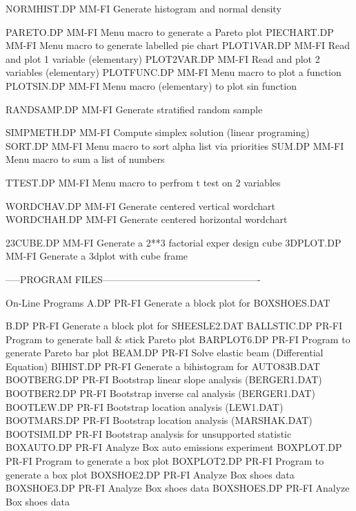 NORMHIST.DP                 MM-FI Generate histogram and normal density

PARETO.DP                   MM-FI Menu macro to generate a Pareto plot
PIECHART.DP                 MM-FI Menu macro to generate labelled pie chart
PLOT1VAR.DP                 MM-FI Read and plot 1 variable (elementary)
PLOT2VAR.DP                 MM-FI Read and plot 2 variables (elementary)
PLOTFUNC.DP                 MM-FI Menu macro to plot a function
PLOTSIN.DP                  MM-FI Menu macro (elementary) to plot sin function

RANDSAMP.DP                 MM-FI Generate stratified random sample

SIMPMETH.DP                 MM-FI Compute simplex solution (linear programing)
SORT.DP                     MM-FI Menu macro to sort alpha list via priorities
SUM.DP                      MM-FI Menu macro to sum a list of numbers

TTEST.DP                    MM-FI Menu macro to perfrom t test on 2 variables

WORDCHAV.DP                 MM-FI Generate centered vertical wordchart
WORDCHAH.DP                 MM-FI Generate centered horizontal wordchart

23CUBE.DP                   MM-FI Generate a 2**3 factorial exper design cube
3DPLOT.DP                   MM-FI Generate a 3dplot with cube frame

-----PROGRAM FILES-------------------------------------------------

On-Line Programs
A.DP                        PR-FI Generate a block plot for BOXSHOES.DAT

B.DP                        PR-FI Generate a block plot for SHEESLE2.DAT
BALLSTIC.DP                 PR-FI Program to generate ball & stick Pareto plot
BARPLOT6.DP                 PR-FI Program to generate Pareto bar plot
BEAM.DP                     PR-FI Solve elastic beam (Differential Equation)
BIHIST.DP                   PR-FI Generate a bihistogram for AUTO83B.DAT
BOOTBERG.DP                 PR-FI Bootstrap linear slope analysis (BERGER1.DAT)
BOOTBER2.DP                 PR-FI Bootstrap inverse cal analysis (BERGER1.DAT)
BOOTLEW.DP                  PR-FI Bootstrap location analysis (LEW1.DAT)
BOOTMARS.DP                 PR-FI Bootstrap location analysis (MARSHAK.DAT)
BOOTSIMI.DP                 PR-FI Bootstrap analysis for unsupported statistic
BOXAUTO.DP                  PR-FI Analyze Box auto emissions experiment
BOXPLOT.DP                  PR-FI Program to generate a box plot
BOXPLOT2.DP                 PR-FI Program to generate a box plot
BOXSHOE2.DP                 PR-FI Analyze Box shoes data 
BOXSHOE3.DP                 PR-FI Analyze Box shoes data
BOXSHOES.DP                 PR-FI Analyze Box shoes data

